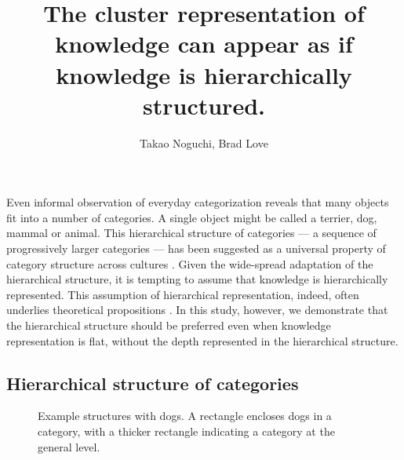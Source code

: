 \documentclass[doc]{apa6}
\title{The cluster representation of knowledge can appear as if knowledge is hierarchically
structured.}
\author{Takao Noguchi, Brad Love}
\affiliation{Department of Experimental Psychology, University College London}
\begin{document}
\maketitle

Even informal observation of everyday categorization reveals that many objects fit into a number of
categories. A single object might be called a terrier, dog, mammal or animal. This hierarchical
structure of categories --- a sequence of progressively larger categories --- has been suggested as
a universal property of category structure across cultures \parencite{Berlin1992a, Atran1998a}.
Given the wide-spread adaptation of the hierarchical structure, it is tempting to assume that
knowledge is hierarchically represented. This assumption of hierarchical representation, indeed,
often underlies theoretical propositions \parencite[e.g.,][]{Tenenbaum2011a}. In this study,
however, we demonstrate that the hierarchical structure should be preferred even when knowledge
representation is flat, without the depth represented in the hierarchical structure.



\subsection*{Hierarchical structure of categories}

\begin{figure}
    \centering



    \vspace{10pt}

    \caption{Example structures with dogs. A rectangle encloses dogs in a category, with a thicker
    rectangle indicating a category at the general level.}

\label{fig:example}
\end{figure}
\end{document}
